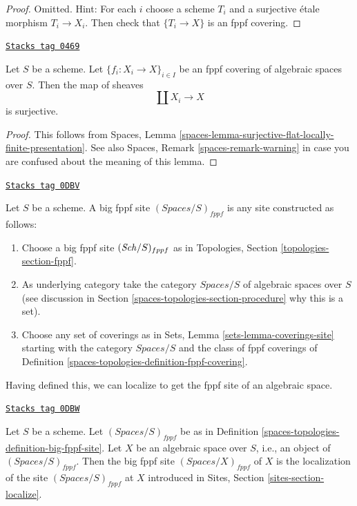 \begin{proof}
Omitted. Hint: For each $i$ choose a scheme $T_i$ and a surjective \'etale
morphism $T_i \to X_i$. Then check that $\{T_i \to X\}$ is an fppf covering.
\end{proof}

\begin{lemma}
\label{spaces-topologies-lemma-fppf-covering-surjective}
\href{https://stacks.math.columbia.edu/tag/0469}{\texttt{Stacks tag 0469}}

Let $S$ be a scheme.
Let $\{f_i : X_i \to X\}_{i \in I}$ be an fppf covering of algebraic
spaces over $S$. Then the map of sheaves
$$
\coprod X_i \longrightarrow X
$$
is surjective.
\end{lemma}

\begin{proof}
This follows from
Spaces, Lemma \ref{spaces-lemma-surjective-flat-locally-finite-presentation}.
See also
Spaces, Remark \ref{spaces-remark-warning}
in case you are confused about the meaning of this lemma.
\end{proof}

\begin{definition}
\label{spaces-topologies-definition-big-fppf-site}
\href{https://stacks.math.columbia.edu/tag/0DBV}{\texttt{Stacks tag 0DBV}}

Let $S$ be a scheme. A big fppf site {\it $(\textit{Spaces}/S)_{fppf}$}
is any site constructed as follows:
\begin{enumerate}
\item Choose a big fppf site $(\mathit{Sch}/S)_{fppf}$ as in
Topologies, Section \ref{topologies-section-fppf}.
\item As underlying category take the category $\textit{Spaces}/S$
of algebraic spaces over $S$ (see discussion in
Section \ref{spaces-topologies-section-procedure} why this is a set).
\item Choose any set of coverings as in
Sets, Lemma \ref{sets-lemma-coverings-site} starting with the
category $\textit{Spaces}/S$ and the class of fppf coverings
of Definition \ref{spaces-topologies-definition-fppf-covering}.
\end{enumerate}
\end{definition}

Having defined this, we can localize to get the fppf
site of an algebraic space.

\begin{definition}
\label{spaces-topologies-definition-big-small-fppf}
\href{https://stacks.math.columbia.edu/tag/0DBW}{\texttt{Stacks tag 0DBW}}

Let $S$ be a scheme. Let $(\textit{Spaces}/S)_{fppf}$ be as in
Definition \ref{spaces-topologies-definition-big-fppf-site}.
Let $X$ be an algebraic space over $S$, i.e., an object of
$(\textit{Spaces}/S)_{fppf}$. Then the big fppf site
{\it $(\textit{Spaces}/X)_{fppf}$} of $X$
is the localization of the site $(\textit{Spaces}/S)_{fppf}$
at $X$ introduced in Sites, Section \ref{sites-section-localize}.
\end{definition}

